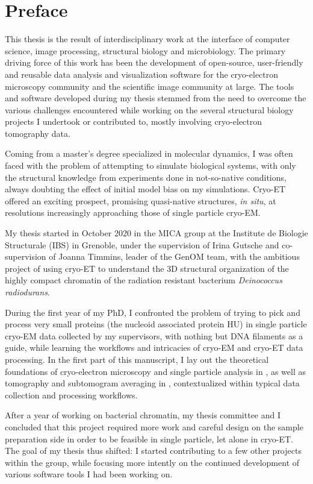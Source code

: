 \chapter{Preface}

This thesis is the result of interdisciplinary work at the interface of computer science, image processing, structural biology and microbiology.
The primary driving force of this work has been the development of open-source, user-friendly and reusable data analysis and visualization software for the cryo-electron microscopy community and the scientific image community at large.
The tools and software developed during my thesis stemmed from the need to overcome the various challenges encountered while working on the several structural biology projects I undertook or contributed to, mostly involving cryo-electron tomography data.

Coming from a master's degree specialized in molecular dynamics, I was often faced with the problem of attempting to simulate biological systems, with only the structural knowledge from experiments done in not-so-native conditions, always doubting the effect of initial model bias on my simulations.
Cryo-ET offered an exciting prospect, promising quasi-native structures, \textit{in situ}, at resolutions increasingly approaching those of single particle cryo-EM.

My thesis started in October 2020 in the MICA group at the Institute de Biologie Structurale (IBS) in Grenoble, under the supervision of Irina Gutsche and co-supervision of Joanna Timmins, leader of the GenOM team, with the ambitious project of using cryo-ET to understand the 3D structural organization of the highly compact chromatin of the radiation resistant bacterium \textit{Deinococcus radiodurans}.

During the first year of my PhD, I confronted the problem of trying to pick and process very small proteins (the nucleoid associated protein HU) in single particle cryo-EM data collected by my supervisors, with nothing but DNA filaments as a guide, while learning the workflows and intricacies of cryo-EM and cryo-ET data processing.
In the first part of this manuscript, I lay out the theoretical foundations of cryo-electron microscopy and single particle analysis in , as well as tomography and subtomogram averaging in , contextualized within typical data collection and processing workflows.

After a year of working on bacterial chromatin, my thesis committee and I concluded that this project required more work and careful design on the sample preparation side in order to be feasible in single particle, let alone in cryo-ET.
The goal of my thesis thus shifted: I started contributing to a few other projects within the group, while focusing more intently on the continued development of various software tools I had been working on.

